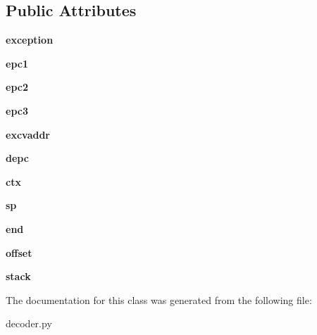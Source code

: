 \subsection*{Public Attributes}
\begin{DoxyCompactItemize}
\item 
\mbox{\label{classdecoder_1_1_exception_data_parser_ab81e11fb10b04fb2acfbdd088e2a8934}} 
{\bfseries exception}
\item 
\mbox{\label{classdecoder_1_1_exception_data_parser_a8b4e81e1202d5d44c43882da6d00f592}} 
{\bfseries epc1}
\item 
\mbox{\label{classdecoder_1_1_exception_data_parser_a6d7767d267ba0494d814af74568e59a0}} 
{\bfseries epc2}
\item 
\mbox{\label{classdecoder_1_1_exception_data_parser_af3826a18a3aea39d56dd25851ee8ed03}} 
{\bfseries epc3}
\item 
\mbox{\label{classdecoder_1_1_exception_data_parser_a5bab9f52e6f9a3abd135c76d38e1fbf6}} 
{\bfseries excvaddr}
\item 
\mbox{\label{classdecoder_1_1_exception_data_parser_a2311211d6d2e672167e4bb06736b070d}} 
{\bfseries depc}
\item 
\mbox{\label{classdecoder_1_1_exception_data_parser_a2cb194c200ac018190e7752174748c6d}} 
{\bfseries ctx}
\item 
\mbox{\label{classdecoder_1_1_exception_data_parser_acfaf42bae5d8fa0367fdd402afec658a}} 
{\bfseries sp}
\item 
\mbox{\label{classdecoder_1_1_exception_data_parser_a620ea2b6167ae41549acc5a70b3d243f}} 
{\bfseries end}
\item 
\mbox{\label{classdecoder_1_1_exception_data_parser_aeebb5300399da3168d3b19ab8ba3952b}} 
{\bfseries offset}
\item 
\mbox{\label{classdecoder_1_1_exception_data_parser_a3f12200c72fa2ac80dbc2a94de453eb4}} 
{\bfseries stack}
\end{DoxyCompactItemize}


The documentation for this class was generated from the following file\+:\begin{DoxyCompactItemize}
\item 
decoder.\+py\end{DoxyCompactItemize}
